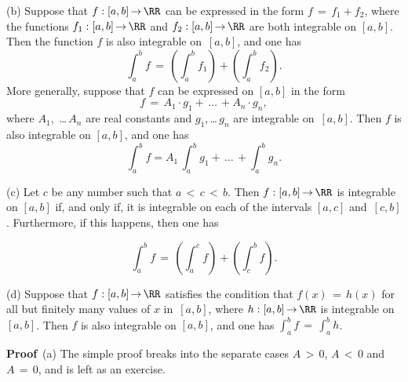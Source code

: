         (b) Suppose that $f:[a,b] \,{\rightarrow}\, {\RR}$ can be expressed in the form $f \,=\, f_{1} + f_{2}$,
    where the functions $f_{1}:[a,b] \,{\rightarrow}\, {\RR}$ and $f_{2}:[a,b] \,{\rightarrow}\, {\RR}$ are both integrable on $[a,b]$. Then the function $f$ is also integrable on~$[a,b]$, and one has
        \begin{displaymath}
        \int_{a}^{b} f \,=\, \left(\int_{a}^{b} f_{1}\right) + \left(\int_{a}^{b} f_{2}\right).
        \end{displaymath}
    More generally, suppose that $f$ can be expressed on $[a,b]$ in the form
        \begin{displaymath}
        f \,=\, A_{1}{\cdot}g_{1} + \,{\ldots}\, + A_{n}{\cdot}g_{n},
        \end{displaymath}
    where $A_{1}$, \,{\ldots}\,$A_{n}$ are real constants and $g_{1}$,\,{\ldots}\,$g_{n}$ are integrable on~$[a,b]$.
    Then $f$ is also integrable on $[a,b]$, and one has
        \begin{displaymath}
        \int_{a}^{b} f = A_{1}\,\int_{a}^{b} g_{1} + \,{\ldots}\, + \int_{a}^{b} g_{n}.
        \end{displaymath}

\V

        (c) Let $c$ be any number such that $a\,<\,c\,<\,b$. Then $f:[a,b] \,{\rightarrow}\, {\RR}$ is integrable on $[a,b]$ if, and only if, it is integrable on each of the intervals $[a,c]$ and~$[c,b]$.
    Furthermore, if this happens, then one has

        \begin{displaymath}
        \int_{a}^{b} f \,=\, \left(\int_{a}^{c} f\right) + \left(\int_{c}^{b} f\right).
        \end{displaymath}

\V

        (d) Suppose that $f:[a,b] \,{\rightarrow}\, {\RR}$ satisfies the condition that
    $f(x) \,=\, h(x)$ for all but finitely many values of $x$ in~$[a,b]$,
    where $h:[a,b] \,{\rightarrow}\, {\RR}$ is integrable on~$[a,b]$. Then $f$ is also integrable on $[a,b]$, and one has ${\displaystyle \int_{a}^{b} f \,=\, \int_{a}^{b} h}$.

\V


        {\bf Proof}\, (a) The simple proof breaks into the separate cases $A\,>\,0$, $A\,<\,0$ and $A \,=\, 0$, and is left as an exercise. %

\V


